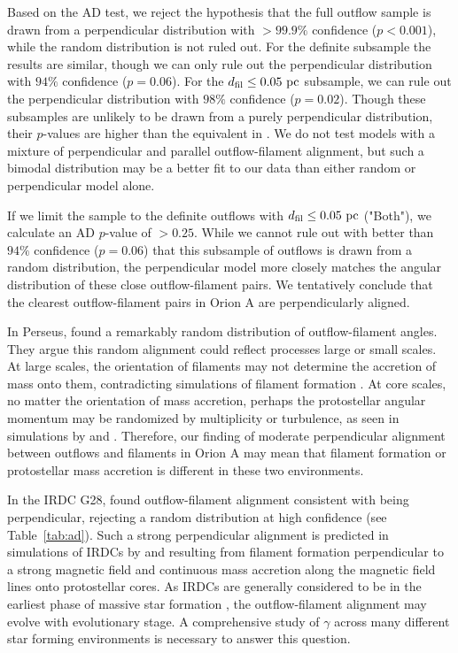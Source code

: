 \documentclass[twocolumn]{aastex63}
\begin{document}
Based on the AD test, we reject the hypothesis that the full outflow sample is drawn from a perpendicular distribution with $>99.9\%$ confidence ($p < 0.001$), while the random distribution is not ruled out. For the definite subsample the results are similar, though we can only rule out the perpendicular distribution with $94\%$ confidence ($p = 0.06$). For the $d_{\rm fil} \leq 0.05~\rm{pc}$ subsample, we can rule out the perpendicular distribution with $98\%$ confidence ($p = 0.02$). Though these subsamples are unlikely to be drawn from a purely perpendicular distribution, their $p$-values are higher than the equivalent in \citet{Stephens17}. We do not test models with a mixture of perpendicular and parallel outflow-filament alignment, but such a bimodal distribution may be a better fit to our data than either random or perpendicular model alone.

If we limit the sample to the definite outflows with $d_{\rm fil} \leq 0.05~\rm{pc}$ ("Both"), we calculate an AD $p$-value of $> 0.25$. While we cannot rule out with better than $94\%$ confidence ($p = 0.06$) that this subsample of outflows is drawn from a random distribution, the perpendicular model more closely matches the angular distribution of these close outflow-filament pairs. We tentatively conclude that the clearest outflow-filament pairs in Orion A are perpendicularly aligned.

In Perseus, \citet{Stephens17} found a remarkably random distribution of outflow-filament angles. They argue this random alignment could reflect processes large or small scales. At large scales, the orientation of filaments may not determine the accretion of mass onto them, contradicting simulations of filament formation \citep[e.g.][]{Chen14,Clarke17}. At core scales, no matter the orientation of mass accretion, perhaps the protostellar angular momentum may be randomized by multiplicity or turbulence, as seen in simulations by \citet{Offner16} and \citet{Lee17}. Therefore, our finding of moderate perpendicular alignment between outflows and filaments in Orion A may mean that filament formation or protostellar mass accretion is different in these two environments.

In the IRDC G28, \citet{Kong19} found outflow-filament alignment consistent with being perpendicular, rejecting a random distribution at high confidence (see Table~\ref{tab:ad}). Such a strong perpendicular alignment is predicted in simulations of IRDCs by \citet{Li18} and \citet{Li19} resulting from filament formation perpendicular to a strong magnetic field and continuous mass accretion along the magnetic field lines onto protostellar cores. As IRDCs are generally considered to be in the earliest phase of massive star formation \citep{Rathborne06}, the outflow-filament alignment may evolve with evolutionary stage. A comprehensive study of $\gamma$ across many different star forming environments is necessary to answer this question.
\end{document}
